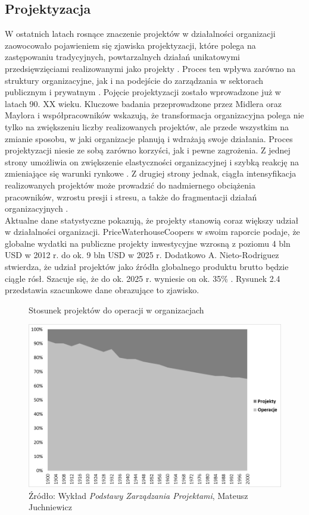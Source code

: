 \subsection{Projektyzacja}
W ostatnich latach rosnące znaczenie projektów w działalności organizacji zaowocowało pojawieniem się zjawiska projektyzacji, które polega na zastępowaniu tradycyjnych, powtarzalnych działań unikatowymi przedsięwzięciami realizowanymi jako projekty \autocite{Juchniewicz2018}. Proces ten wpływa zarówno na struktury organizacyjne, jak i na podejście do zarządzania w sektorach publicznym i prywatnym \autocite{Midler1995}.
Pojęcie projektyzacji zostało wprowadzone już w latach 90. XX wieku. Kluczowe badania przeprowadzone przez Midlera oraz Maylora i współpracowników \autocite{Maylor2006} wskazują, że transformacja organizacyjna polega nie tylko na zwiększeniu liczby realizowanych projektów, ale przede wszystkim na zmianie sposobu, w jaki organizacje planują i wdrażają swoje działania. Proces projektyzacji niesie ze sobą zarówno korzyści, jak i pewne zagrożenia. Z jednej strony umożliwia on zwiększenie elastyczności organizacyjnej i szybką reakcję na zmieniające się warunki rynkowe \autocite{Prawelska2011}. Z drugiej strony jednak, ciągła intensyfikacja realizowanych projektów może prowadzić do nadmiernego obciążenia pracowników, wzrostu presji i stresu, a także do fragmentacji działań organizacyjnych \autocite{Jalocha2012}.
\\
Aktualne dane statystyczne pokazują, że projekty stanowią coraz większy udział w działalności organizacji. PriceWaterhouseCoopers w swoim raporcie podaje, że globalne wydatki na publiczne projekty inwestycyjne wzrosną z poziomu 4 bln USD w 2012 r. do ok. 9 bln USD w 2025 r. \autocite{pwc}
Dodatkowo A. Nieto-Rodriguez stwierdza, że udział projektów jako źródła globalnego produktu brutto będzie ciągle rósł. Szacuje się,
że do ok. 2025 r. wyniesie on ok. 35\% \autocite{Nieto}. Rysunek 2.4 przedstawia szacunkowe dane obrazujące to zjawisko.
\begin{figure}
\centering
\caption{Stosunek projektów do operacji w organizacjach}
\includegraphics[width=14cm]{img/projektyzacja.png}
\caption*{Źródło: Wykład \textit{Podstawy Zarządzania Projektami}, Mateusz Juchniewicz}
\end{figure}
